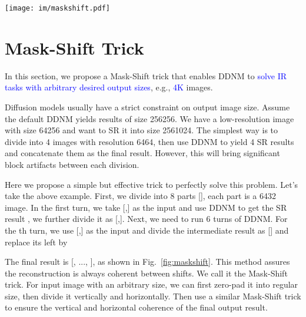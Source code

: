 \documentclass{article} \usepackage{iclr2023_conference,times}
\begin{document}
\begin{figure*}[t]
  \centering
  \vspace{-0.5cm}
  \texttt{[image: im/maskshift.pdf]}
  \vspace{-0.5cm}
  \caption{4SR using Mask-Shift trick, DDNM. Input size: 64256; output size: 2561024.}
\label{fig:maskshift} 
\end{figure*}

\section{Mask-Shift Trick}
In this section, we propose a Mask-Shift trick that enables DDNM to \textcolor{blue}{solve IR tasks with arbitrary desired output sizes}, e.g., \textcolor{blue}{4K} images.

Diffusion models usually have a strict constraint on output image size. Assume the default DDNM yields results of size 256256. We have a low-resolution image  with size 64256 and want to SR it into size 2561024. The simplest way is to divide  into 4 images with resolution 6464, then use DDNM to yield 4 SR results and concatenate them as the final result. However, this will bring significant block artifacts between each division.

Here we propose a simple but effective trick to perfectly solve this problem. Let's take the above example. First, we divide  into 8 parts [], each part is a 6432 image. In the first turn, we take [,] as the input and use DDNM to get the SR result , we further divide it as [,]. Next, we need to run 6 turns of DDNM. For the th turn, we use [,] as the input and divide the intermediate result  as [] and replace its left by

The final result is [, ..., ], as shown in Fig.~\ref{fig:maskshift}. This method assures the reconstruction is always coherent between shifts. We call it the Mask-Shift trick. For input image  with an arbitrary size, we can first zero-pad it into regular size, then divide it vertically and horizontally. Then use a similar Mask-Shift trick to ensure the vertical and horizontal coherence of the final output result.







\newpage

\appendix
\end{document}
